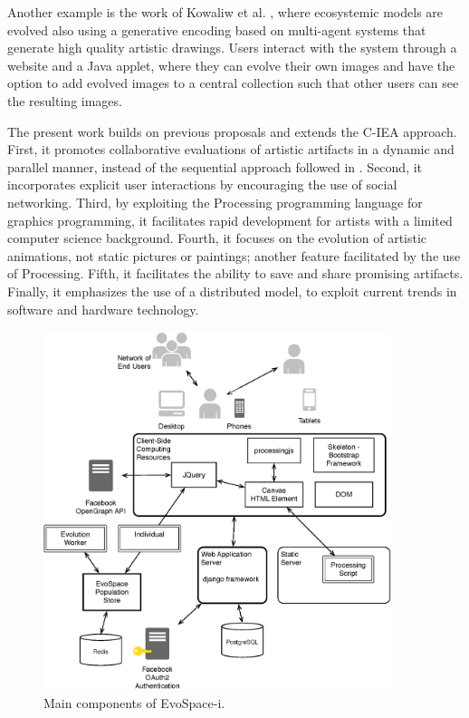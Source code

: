\documentclass{sig-alternate}
\begin{document}
Another example is the work of Kowaliw et al. \cite{evoeco}, where ecosystemic models are evolved also using a generative encoding based on multi-agent systems
that generate high quality artistic drawings.
Users interact with the system through a website and a Java applet, where they can evolve their own images and have the option
to add evolved images to a central collection such that other users can see the resulting images.


The present work builds on previous proposals and extends the C-IEA approach.
First, it promotes collaborative evaluations of artistic artifacts in a dynamic and parallel manner,
instead of the sequential approach followed in \cite{picbreeder,forms}.
Second, it incorporates explicit user interactions by encouraging the use of social networking.
Third, by exploiting the Processing programming language for graphics programming, it facilitates rapid development for artists
with a limited computer science background.
Fourth, it focuses on the evolution of artistic animations, not static pictures or paintings; another feature facilitated by the use of Processing.
Fifth, it facilitates the ability to save and share promising artifacts.
Finally, it emphasizes the use of a distributed model, to exploit current trends in software and hardware technology.

\begin{figure}[!t]
    \centering
        \includegraphics[width=4in]{Architecture.eps}
    \caption{Main components of EvoSpace-i.}
    \label{fig:arch}
\end{figure}
\end{document}
